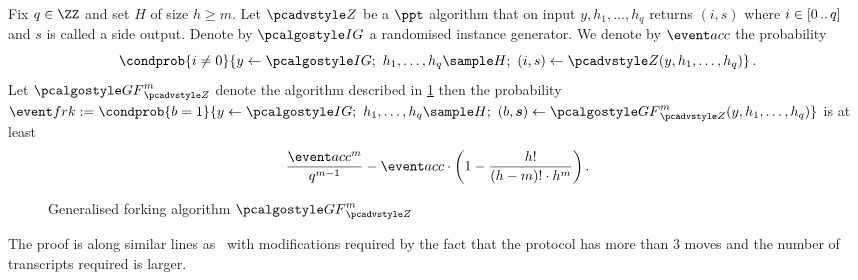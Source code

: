 \begin{lemma}
	\label{lem:generalised_forking_lemma}
	Fix $q \in \ZZ$ and set $H$ of size $h \geq m$. Let $\zdv$ be a $\ppt$
  algorithm that on input $y, h_1, \ldots, h_q$ returns $(i, s)$ where $i \in
  [0 \, .. \, q]$ and $s$ is called a side output. Denote by $\ig$ a randomised
  instance generator. We denote by $\accProb$ the probability
	\[
		\condprob{i \neq 0}{ y \gets \ig;\ h_1, \ldots, h_q \sample H;\ (i, s)
		\gets \zdv(y, h_1, \ldots, h_q)}\,.
	\]
	Let $\genforking_{\zdv}^{m}$ denote the algorithm described in
  \cref{fig:genforking_lemma} then the probability $\frkProb := \condprob{b =
    1}{y \gets \ig;\ h_1, \ldots, h_{q} \sample H;\ (b, \vec{s}) \gets
    \genforking_{\zdv}^{m}(y, h_1, \ldots, h_q)}$ is at least
	\[
		\frac{\accProb^m}{q^{m - 1}} - \accProb \cdot \left(1 -
    \frac{h!}{(h - m)! \cdot h^{m}}\right).
	\]
		
	\begin{figure}[t]
		\centering
	\caption{Generalised forking algorithm $\genforking_{\zdv}^{m}$}
	\label{fig:genforking_lemma}
\end{figure}
\end{lemma}
The proof is along similar lines as~\cite[Lemma 1]{CCS:BelNev06} with modifications required
by the fact that the protocol has more than $3$ moves and the number of
transcripts required is larger. 

